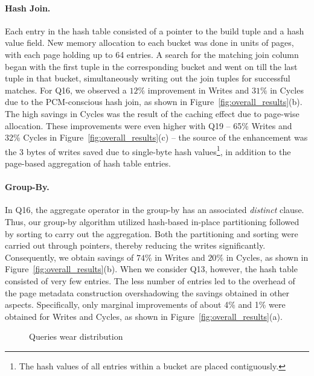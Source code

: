 \paragraph{Hash Join.}
Each entry in the hash table consisted of a pointer to the build tuple
and a hash value field. New memory allocation to each bucket was done
in units of pages, with each page holding up to 64 entries. A search for
the matching join column began with the first tuple in the corresponding
bucket and went on till the last tuple in that bucket, simultaneously
writing out the join tuples for successful matches.  For Q16, we
observed a $12\%$ improvement in Writes and $31\%$ in Cycles due to the
PCM-conscious hash join, as shown in Figure~\ref{fig:overall_results}(b). The high savings in Cycles was the result of the caching effect due to page-wise allocation.
These improvements were even higher with Q19  -- 65\% Writes and 32\%
Cycles in Figure~\ref{fig:overall_results}(c) -- the source of the
enhancement was the 3 bytes of writes saved due to single-byte hash
values\footnote{The hash values of all entries within a bucket are placed contiguously.}, in addition to the page-based aggregation of hash table entries.


\paragraph{Group-By.}
In Q16, the aggregate operator in the group-by has an associated
\textit{distinct} clause.  Thus, our group-by algorithm utilized
hash-based in-place partitioning followed by sorting to carry out the
aggregation. Both the partitioning and sorting were carried out through
pointers, thereby reducing the writes significantly. Consequently,
we obtain savings of $74\%$ in Writes and $20\%$ in Cycles, as shown
in Figure~\ref{fig:overall_results}(b).  When we consider Q13, however,
the hash table consisted of very few entries. The less number of entries
led to the overhead of the page metadata construction overshadowing the
savings obtained in other aspects. Specifically, only marginal improvements
of about 4\% and 1\% were obtained for Writes and Cycles, as shown in
Figure~\ref{fig:overall_results}(a).

\begin{figure*}[t]
\centering

\caption{Queries wear distribution }
\label{fig:wear_dist}
\end{figure*}



